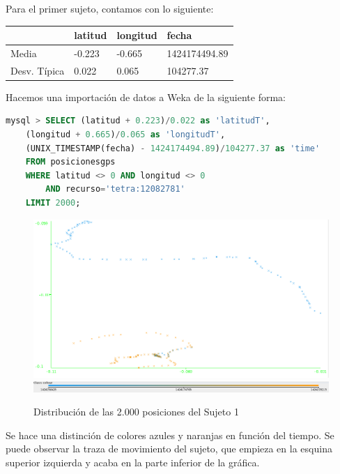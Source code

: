 \documentclass[a4paper, 12pt, spanish]{article}
\begin{document}
Para el primer sujeto, contamos con lo siguiente:\\

	\begin{tabular}{l|l|l|l}
	\rowcolor{LightCyan}
	\hline
		& latitud & longitud & fecha\\
	\hline
		Media & -0.223 & -0.665 & 1424174494.89 \\
		Desv. T\'ipica & 0.022 & 0.065	& 104277.37 \\
	\end{tabular}
	
\bigskip

Hacemos una importaci\'on de datos a Weka de la siguiente forma:\\

\begin{lstlisting}[language=sql, columns=fullflexible, basicstyle=\small, frame=tblr]
mysql > SELECT (latitud + 0.223)/0.022 as 'latitudT', 
	(longitud + 0.665)/0.065 as 'longitudT',
	(UNIX_TIMESTAMP(fecha) - 1424174494.89)/104277.37 as 'time'
	FROM posicionesgps
	WHERE latitud <> 0 AND longitud <> 0 
		AND recurso='tetra:12082781'
	LIMIT 2000;
\end{lstlisting}

\begin{figure}[H]
	\includegraphics[scale=.5]{../comparativa/sujeto1.png}
	\includegraphics[scale=.4]{../comparativa/leyenda.png}
	\caption{Distribuci\'on de las 2.000 posiciones del Sujeto 1}
\end{figure}

Se hace una distinci\'on de colores azules y naranjas en funci\'on del tiempo. Se puede observar la traza de movimiento del sujeto, que empieza en la esquina superior izquierda y acaba en la parte inferior de la gr\'afica. \\
\end{document}
